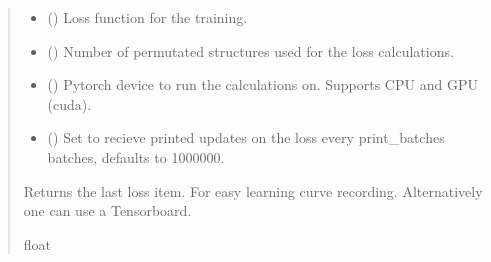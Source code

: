 \documentclass[a4paper,10pt,english]{report}
\begin{document}
\begin{fulllineitems}
\begin{quote}
\begin{description}
\begin{itemize}
\item {} 
\sphinxAtStartPar
{} () \textendash{} Loss function for the training.

\item {} 
\sphinxAtStartPar
{} () \textendash{} Number of permutated structures used for the loss calculations.

\item {} 
\sphinxAtStartPar
{} () \textendash{} Pytorch device to run the calculations on. Supports CPU and GPU (cuda).

\item {} 
\sphinxAtStartPar
{} (\sphinxstyleliteralemphasis{\sphinxupquote{, }}) \textendash{} Set to recieve printed updates on the loss every print\_batches batches, defaults to 1000000.

\end{itemize}

\sphinxAtStartPar
Returns the last loss item. For easy learning curve recording. Alternatively one can use a Tensorboard.

\sphinxAtStartPar
float

\end{description}\end{quote}

\end{fulllineitems}

\end{document}
